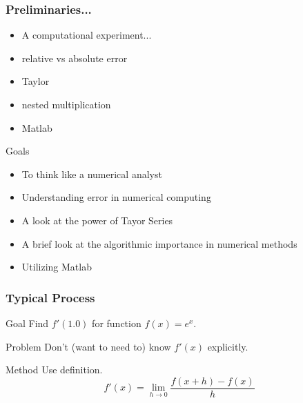\documentclass[10pt]{beamer}
\begin{document}
\begin{frame}
\frametitle{Preliminaries...}
\begin{itemize}
  \item A computational experiment...
  \item relative vs absolute error
  \item Taylor
  \item nested multiplication
  \item Matlab
\end{itemize}
\begin{block}{Goals}
  \begin{itemize}
  \item To think like a numerical analyst
  \item Understanding error in numerical computing
  \item A look at the power of Tayor Series
  \item A brief look at the algorithmic importance in numerical methods
  \item Utilizing Matlab
\end{itemize}
\end{block}
\end{frame}
\begin{frame}
\frametitle{Typical Process}
\begin{block}{Goal}
  Find $f'(1.0)$ for function $f(x)=e^{x}$.
\end{block}
\begin{block}{Problem}
  Don't (want to need to) know $f'(x)$ explicitly.
\end{block}
\begin{block}{Method}
  Use definition.
  \begin{equation*} 
    f'(x) = \lim_{h\rightarrow 0} \frac{f(x+h) - f(x)}{h}
\end{equation*}
\end{block}
\end{frame}
\end{document}
